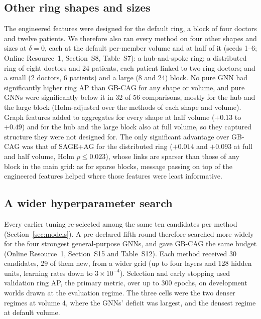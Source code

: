 \documentclass[pdflatex,sn-vancouver-num]{sn-jnl}
\newcommand{\SSecShapes}{S8}\newcommand{\STabShapes}{S7}
\newcommand{\SSecWide}{S15}\newcommand{\STabWide}{S12}
\begin{document}
\subsection{Other ring shapes and sizes}\label{sec:shapes}
The engineered features were designed for the default ring, a block of four
doctors and twelve patients. We therefore also ran every method on four other
shapes and sizes at $\delta=0$, each at the default per-member volume and at
half of it (seeds 1--6; Online Resource~1, Section~\SSecShapes,
Table~\STabShapes): a hub-and-spoke ring; a distributed ring of eight
doctors and 24 patients, each patient linked to two ring doctors; and a small
(2 doctors, 6 patients) and a large (8 and 24) block. No pure GNN had
significantly higher ring AP than GB-CAG for any shape or volume, and pure
GNNs were significantly below it in 32 of 56 comparisons, mostly for the hub
and the large block (Holm-adjusted over the methods of each shape and
volume). Graph features added to aggregates for every shape at half volume
($+0.13$ to $+0.49$) and for the hub and the large block also at full
volume, so they captured structure they were not designed for. The only
significant advantage over GB-CAG was that of SAGE+AG for the distributed
ring ($+0.014$ and $+0.093$ at full and half volume, Holm $p\le0.023$),
whose links are sparser than those of any block in the main grid: as for
sparse blocks, message passing on top of the engineered features helped where
those features were least informative.

\subsection{A wider hyperparameter search}\label{sec:wide}
Every earlier tuning re-selected among the same ten candidates per method
(Section~\ref{sec:models}). A pre-declared fifth round therefore searched more
widely for the four strongest general-purpose GNNs, and gave GB-CAG the same
budget (Online Resource~1, Section~\SSecWide{} and Table~\STabWide). Each
method received 30 candidates, 29 of them new, from a wider grid (up to four
layers and 128 hidden units, learning rates down to $3\times10^{-4}$). Selection
and early stopping used validation ring AP, the primary metric, over up to 300
epochs, on development worlds drawn at the evaluation regime. The three cells
were the two denser regimes at volume 4, where the GNNs' deficit was largest,
and the densest regime at default volume.
\end{document}

